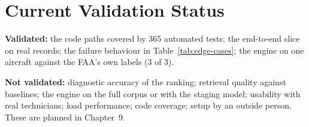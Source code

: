 

\section{Current Validation Status}

\textbf{Validated:} the code paths covered by 365 automated tests; the end-to-end slice on real records; the failure behaviour in Table~\ref{tab:edge-cases}; the engine on one aircraft against the FAA's own labels (3 of 3).

\textbf{Not validated:} diagnostic accuracy of the ranking; retrieval quality against baselines; the engine on the full corpus or with the staging model; usability with real technicians; load performance; code coverage; setup by an outside person. These are planned in Chapter~9.
